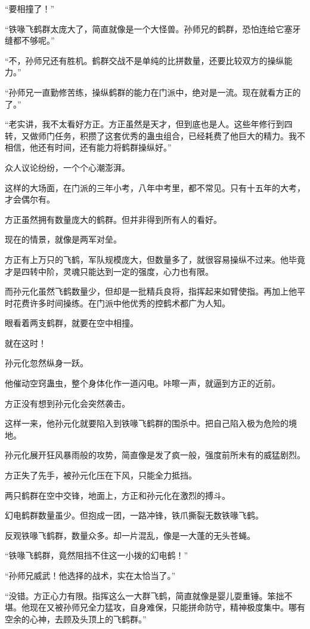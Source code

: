 \begin{this_body}
“要相撞了！”

“铁喙飞鹤群太庞大了，简直就像是一个大怪兽。孙师兄的鹤群，恐怕连给它塞牙缝都不够呢。”

“不，孙师兄还有胜机。鹤群交战不是单纯的比拼数量，还要比较双方的操纵能力。”

“孙师兄一直勤修苦练，操纵鹤群的能力在门派中，绝对是一流。现在就看方正的了。”

“老实讲，我不太看好方正。方正虽然是天才，但到底也是人。这些年修行到四转，又做师门任务，积攒了这套优秀的蛊虫组合，已经耗费了他巨大的精力。我不相信，他还有时间，还有能力将鹤群操纵好。”

众人议论纷纷，一个个心潮澎湃。

这样的大场面，在门派的三年小考，八年中考里，都不常见。只有十五年的大考，才会偶尔有。

方正虽然拥有数量庞大的鹤群。但并非得到所有人的看好。

现在的情景，就像是两军对垒。

方正有上万只的飞鹤，军队规模庞大，但数量多了，就很容易操纵不过来。他毕竟才是四转中阶，灵魂只能达到一定的强度，心力也有限。

而孙元化虽然飞鹤数量少，但却是一批精兵良将，指挥起来如臂使指。再加上他平时花费许多时间操练。在门派中他优秀的控鹤术都广为人知。

眼看着两支鹤群，就要在空中相撞。

就在这时！

孙元化忽然纵身一跃。

他催动空窍蛊虫，整个身体化作一道闪电。咔嚓一声，就逼到方正的近前。

方正没有想到孙元化会突然袭击。

这样一来，他孙元化就要陷入到铁喙飞鹤群的围杀中。把自己陷入极为危险的境地。

孙元化展开狂风暴雨般的攻势，简直像是发了疯一般，强度前所未有的威猛剧烈。

方正失了先手，被孙元化压在下风，只能全力抵挡。

两只鹤群在空中交锋，地面上，方正和孙元化在激烈的搏斗。

幻电鹤群数量虽少。但抱成一团，一路冲锋，铁爪撕裂无数铁喙飞鹤。

反观铁喙飞鹤群，数量众多。却一片混乱，像是一大蓬的无头苍蝇。

“铁喙飞鹤群，竟然阻挡不住这一小拨的幻电鹤！”

“孙师兄威武！他选择的战术，实在太恰当了。”

“没错。方正心力有限。指挥这么一大群飞鹤，简直就像是婴儿耍重锤。笨拙不堪。他现在又被孙师兄全力猛攻，自身难保，只能拼命防守，精神极度集中。哪有空余的心神，去顾及头顶上的飞鹤群。”


\end{this_body}
